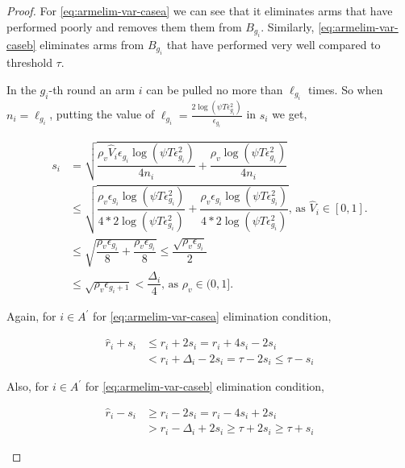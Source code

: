 \begin{proof}
For \ref{eq:armelim-var-casea} we can see that it eliminates arms that have performed poorly and removes them them from $B_{g_{i}}$. Similarly, \ref{eq:armelim-var-caseb} eliminates arms from $B_{g_{i}}$ that have performed very well compared to threshold $\tau$.


In the $g_{i}$-th round an arm $i$ can be pulled no more than $\ell_{g_{i}}$ times. So when $n_{i}=\ell_{g_{i}}$, putting the value of $\ell_{g_{i}}=\frac{2\log{(\psi T\epsilon_{g_{i}}^{2})}}{\epsilon_{g_{i}}}$ in $s_{i}$ we get, 
\begin{small}
\begin{align*}
s_{i}&=\sqrt{\dfrac{\rho_v \hat{V}_{i} \epsilon_{g_{i}}\log (\psi T\epsilon_{g_{i}}^{2})}{4 n_{i}} + \dfrac{\rho_v \log{(\psi T\epsilon_{g_{i}}^{2})}}{4 n_{i}}} \\
&\leq \sqrt{\dfrac{\rho_v \epsilon_{g_{i}}\log (\psi T\epsilon_{g_{i}}^{2})}{4*2 \log(\psi T\epsilon_{g_{i}}^{2})} + \dfrac{\rho_v \epsilon_{g_{i}} \log{(\psi T\epsilon_{g_{i}}^{2})}}{4*2 \log(\psi T\epsilon_{g_{i}}^{2})} } \text{, as }\hat{V}_{i}\in [0,1].\\
& \leq \sqrt{\dfrac{\rho_v \epsilon_{g_{i}}}{8} + \dfrac{\rho_v \epsilon_{g_{i}}}{8} } \leq \dfrac{\sqrt{\rho_v \epsilon_{g_{i}}}}{2}\\
& \leq \sqrt{\rho_v \epsilon_{g_{i}+1}} < \dfrac{\Delta_{i}}{4} \text{, as }\rho_v\in (0,1].
\end{align*}
\end{small}


Again, for ${i} \in A^{'}$ for \ref{eq:armelim-var-casea} elimination condition,
\begin{small}
\begin{align*}
\hat{r}_{i} + s_{i}&\leq r_{i} + 2s_{i} = r_{i} + 4s_{i} - 2s_{i} \\
&< r_{i} + \Delta_{i} - 2s_{i} = \tau -2s_{i} \leq \tau - s_{i}
\end{align*}
\end{small} 


Also, for ${i} \in A^{'}$ for \ref{eq:armelim-var-caseb} elimination condition, 
\begin{small}
\begin{align*}
\hat{r}_{i} - s_{i}&\geq r_{i} - 2s_{i} = r_{i} - 4s_{i} + 2s_{i} \\
&> r_{i} - \Delta_{i} + 2s_{i}\geq \tau + 2s_{i} \geq \tau + s_{i}
\end{align*}
\end{small}



\end{proof}
